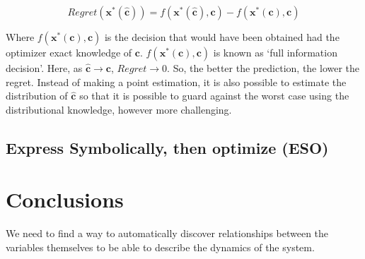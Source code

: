 \documentclass[12pt, letterpaper]{article}
\begin{document}
\begin{equation}
    Regret(\mathbf{x}^*(\hat{\mathbf{c}})) = f(\mathbf{x}^*(\hat{\mathbf{c}}), \mathbf{c}) - f(\mathbf{x}^*(\mathbf{c}), \mathbf{c})
\end{equation}

Where $f(\mathbf{x}^*(\mathbf{c}), \mathbf{c})$ is the decision that would have
been obtained had the optimizer exact knowledge of $\mathbf{c}$.
$f(\mathbf{x}^*(\mathbf{c}), \mathbf{c})$ is known as `full information
decision'. Here, as $\hat{\mathbf{c}} \rightarrow \mathbf{c}$, $Regret
\rightarrow 0$. So, the better the prediction, the lower the regret. Instead of
making a point estimation, it is also possible to estimate the distribution of
$\hat{\mathbf{c}}$ so that it is possible to guard against the worst case using
the distributional knowledge, however more challenging.

\subsection{Express Symbolically, then optimize (ESO)}

\section{Conclusions}
We need to find a way to automatically discover relationships between the
variables themselves to be able to describe the dynamics of the system.
\end{document}
